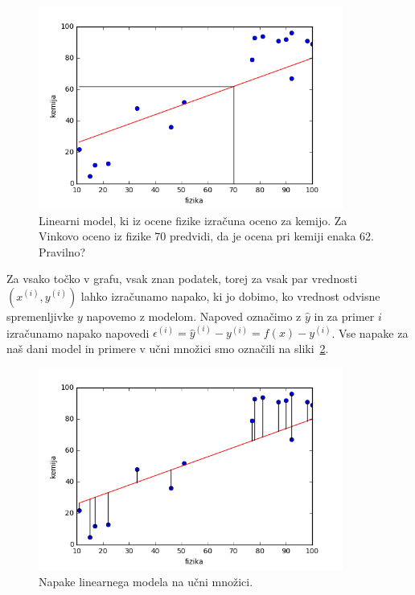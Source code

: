 \begin{figure}[htbp]
\begin{center}
\includegraphics[width=10cm]{slike/fiz-kem-priblizno.png}
\caption{Linearni model, ki iz ocene fizike izračuna oceno za
  kemijo. Za Vinkovo oceno iz fizike 70 predvidi, da je ocena pri
  kemiji enaka 62. Pravilno?}
\label{f:fiz-kem-priblizno}
\end{center}
\end{figure}

Za vsako točko v grafu, vsak znan podatek, torej za vsak par vrednosti
$(x^{(i)},y^{(i)})$ lahko izračunamo napako, ki jo dobimo, ko vrednost odvisne
spremenljivke $y$ napovemo z modelom. Napoved označimo z $\hat{y}$ in
za primer $i$ izračunamo napako napovedi
$\epsilon^{(i)}=\hat{y}^{(i)}-y^{(i)}=f(x)-y^{(i)}$. Vse napake za naš dani model in
primere v učni množici smo označili na sliki~\ref{f:fiz-kem-eps}.

\begin{figure}[htbp]
\begin{center}
\includegraphics[width=10cm]{slike/fiz-kem-eps.png}
\caption{Napake linearnega modela na učni množici.}
\label{f:fiz-kem-eps}
\end{center}
\end{figure}

